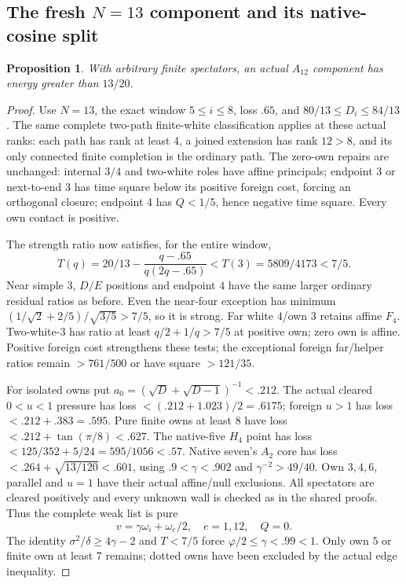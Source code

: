 \documentclass[11pt]{article}
\newtheorem{proposition}[theorem]{Proposition}
\theoremstyle{definition}
\theoremstyle{remark}
\begin{document}
\subsection[The fresh N=13 component and its native-cosine split]{The fresh \(N=13\) component and its native-cosine split}
\label{app:A12}
\begin{proposition}
With arbitrary finite spectators, an actual \(A_{12}\)
component has energy greater than \(13/20\).
\end{proposition}
\begin{proof}
Use \(N=13\), the exact window \(5\leq i\leq8\),
loss \(.65\), and \(80/13\leq D_i\leq84/13\).
The same complete two-path finite-white classification
applies at these actual ranks: each path has rank
at least \(4\), a joined extension has rank \(12>8\),
and its only connected finite completion is the
ordinary path. The zero-own repairs are unchanged:
internal \(3/4\) and two-white roles have affine
principals; endpoint \(3\) or next-to-end \(3\)
has time square below its positive foreign cost,
forcing an orthogonal closure; endpoint \(4\)
has \(Q<1/5\), hence negative time square.
Every own contact is positive.

The strength ratio now satisfies, for the entire
window,
\[
 T(q)=20/13-\frac{q-.65}{q(2q-.65)}
 <T(3)=5809/4173<7/5.
\]
Near simple \(3\), \(D/E\) positions and endpoint
\(4\) have the same larger ordinary residual ratios
as before. Even the near-four exception has minimum
\((1/\sqrt2+2/5)/\sqrt{3/5}>7/5\), so it is strong.
Far white \(4\)/own \(3\) retains affine \(F_4\).
Two-white-\(3\) has ratio at least
\(q/2+1/q>7/5\) at positive own; zero own is affine.
Positive foreign cost strengthens these tests;
the exceptional foreign far/helper ratios remain
\(>761/500\) or have square \(>121/35\).

For isolated owns put
\(a_0=(\sqrt D+\sqrt{D-1})^{-1}<.212\).
The actual cleared \(0<u<1\) pressure has loss
\(<(.212+1.023)/2=.6175\);
foreign \(u>1\) has loss \(<.212+.383=.595\).
Pure finite owns at least \(8\) have loss
\(<.212+\tan(\pi/8)<.627\).
The native-five \(H_4\) point has loss
\(<125/352+5/24=595/1056<.57\).
Native seven's \(A_2\) core has loss
\(<.264+\sqrt{13/120}<.601\),
using \(.9<\gamma<.902\) and
\(\gamma^{-2}>49/40\).
Own \(3,4,6\), parallel and \(u=1\) have their
actual affine/null exclusions.
All spectators are cleared positively and every
unknown wall is checked as in the shared proofs.
Thus the complete weak list is pure
\[
 v=\gamma\omega_i+\omega_e/2,\quad e=1,12,\quad Q=0.
\]
The identity \(\sigma^2/\delta\geq4\gamma-2\)
and \(T<7/5\) force
\(\varphi/2\leq\gamma<.99<1\).
Only own \(5\) or finite own at least \(7\)
remains; dotted owns have been excluded by the
actual edge inequality.


\end{proof}
\end{document}
